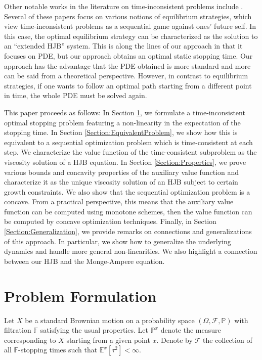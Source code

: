 \documentclass[11pt]{article}
\begin{document}
Other notable works in the literature on time-inconsistent problems include \cite{Bjork2014,Hu2012,Yong2012,Ekeland2010}. Several of these papers focus on various notions of equilibrium strategies, which view time-inconsistent problems as a sequential game against ones' future self. In this case, the optimal equilibrium strategy can be characterized as the solution to an ``extended HJB'' system. This is along the lines of our approach in that it focuses on PDE, but our approach obtains an optimal static stopping time. Our approach has the advantage that the PDE obtained is more standard and more can be said from a theoretical perspective. However, in contrast to equilibrium strategies, if one wants to follow an optimal path starting from a different point in time, the whole PDE must be solved again.

This paper proceeds as follows: In Section \ref{Section:Formulation}, we formulate a time-inconsistent optimal stopping problem featuring a non-linearity in the expectation of the stopping time. In Section \ref{Section:EquivalentProblem}, we show how this is equivalent to a sequential optimization problem which is time-consistent at each step. We characterize the value function of the time-consistent subproblem as the viscosity solution of a HJB equation. In Section \ref{Section:Properties}, we prove various bounds and concavity properties of the auxiliary value function and characterize it as the unique viscosity solution of an HJB subject to certain growth constraints. We also show that the sequential optimization problem is a concave. From a practical perspective, this means that the auxiliary value function can be computed using monotone schemes, then the value function can be computed by concave optimization techniques. Finally, in Section \ref{Section:Generalization}, we provide remarks on connections and generalizations of this approach. In particular, we show how to generalize the underlying dynamics and handle more general non-linearities. We also highlight a connection between our HJB and the Monge-Ampere equation.

\section{Problem Formulation}\label{Section:Formulation}

Let $X$ be a standard Brownian motion on a probability space $(\Omega,\mathcal{F},\mathbb{P})$ with filtration $\mathbb{F}$ satisfying the usual properties. Let $\mathbb{P}^x$ denote the measure corresponding to $X$ starting from a given point $x$. Denote by $\mathcal{T}$ the collection of all $\mathbb{F}$-stopping times such that $\mathbb{E}^x\left[\tau^2\right]<\infty$.
\end{document}
